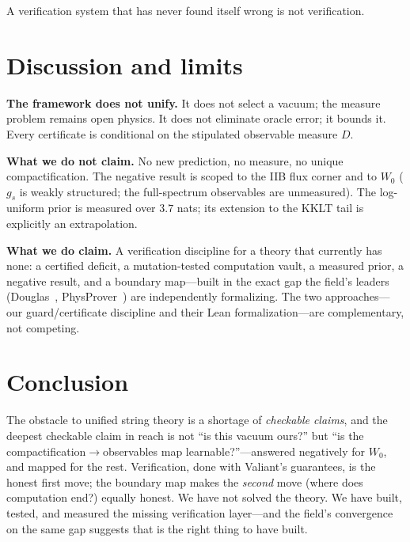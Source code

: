 \documentclass[11pt]{article}
\begin{document}
A verification system that has never found itself wrong is not verification.

\section{Discussion and limits}
\label{sec:discussion}

\textbf{The framework does not unify.} It does not select a vacuum; the measure problem
remains open physics. It does not eliminate oracle error; it bounds it. Every
certificate is conditional on the stipulated observable measure $D$.

\textbf{What we do not claim.} No new prediction, no measure, no unique
compactification. The negative result is scoped to the IIB flux corner and to $W_0$
($g_s$ is weakly structured; the full-spectrum observables are unmeasured). The
log-uniform prior is measured over $3.7$ nats; its extension to the KKLT tail is
explicitly an extrapolation.

\textbf{What we do claim.} A verification discipline for a theory that currently has
none: a certified deficit, a mutation-tested computation vault, a measured prior, a
negative result, and a boundary map---built in the exact gap the field's leaders
(Douglas~\cite{douglas_lean}, PhysProver~\cite{physprover}) are independently
formalizing. The two approaches---our guard/certificate discipline and their Lean
formalization---are complementary, not competing.

\section{Conclusion}

The obstacle to unified string theory is a shortage of \emph{checkable claims}, and the
deepest checkable claim in reach is not ``is this vacuum ours?'' but ``is the
compactification$\to$observables map learnable?''---answered negatively for $W_0$, and
mapped for the rest. Verification, done with Valiant's guarantees, is the honest first
move; the boundary map makes the \emph{second} move (where does computation end?) equally
honest. We have not solved the theory. We have built, tested, and measured the missing
verification layer---and the field's convergence on the same gap suggests that is the
right thing to have built.
\end{document}
